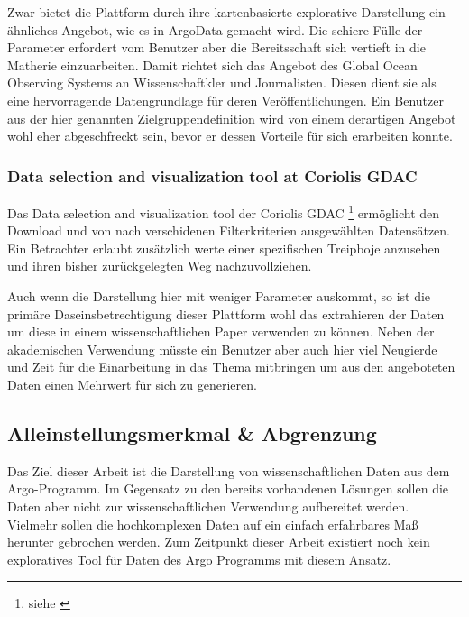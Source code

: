     Zwar bietet die Plattform durch ihre kartenbasierte explorative Darstellung ein ähnliches Angebot, wie es in ArgoData gemacht wird. Die schiere Fülle der Parameter erfordert vom Benutzer aber die Bereitsschaft sich vertieft in die Matherie einzuarbeiten. Damit richtet sich das Angebot des Global Ocean Observing Systems an Wissenschaftkler und Journalisten. Diesen dient sie als eine hervorragende Datengrundlage für deren Veröffentlichungen. Ein Benutzer aus der hier genannten Zielgruppendefinition wird von einem derartigen Angebot wohl eher abgeschfreckt sein, bevor er dessen Vorteile für sich erarbeiten konnte. 
    
    \subsubsection{Data selection and visualization tool at Coriolis GDAC}
    
    Das Data selection and visualization tool der Coriolis GDAC \footnote { siehe \cite{ArgoDataSelection}} ermöglicht den Download und von nach verschidenen Filterkriterien ausgewählten Datensätzen. Ein Betrachter erlaubt zusätzlich werte einer spezifischen Treipboje anzusehen und ihren bisher zurückgelegten Weg nachzuvollziehen.
    
    Auch wenn die Darstellung hier mit weniger Parameter auskommt, so ist die primäre Daseinsbetrechtigung dieser Plattform wohl das extrahieren der Daten um diese in einem wissenschaftlichen Paper verwenden zu können. Neben der akademischen Verwendung müsste ein Benutzer aber auch hier viel Neugierde und Zeit für die Einarbeitung in das Thema mitbringen um aus den angeboteten Daten einen Mehrwert für sich zu generieren. 
    
    
    \subsection{Alleinstellungsmerkmal \& Abgrenzung}
    
    Das Ziel dieser Arbeit ist die Darstellung von wissenschaftlichen Daten aus dem Argo-Programm. Im Gegensatz zu den bereits vorhandenen Lösungen sollen die Daten aber nicht zur wissenschaftlichen Verwendung aufbereitet werden. Vielmehr sollen die hochkomplexen Daten auf ein einfach erfahrbares Maß herunter gebrochen werden. Zum Zeitpunkt dieser Arbeit existiert noch kein exploratives Tool für Daten des Argo Programms mit diesem Ansatz.
    

